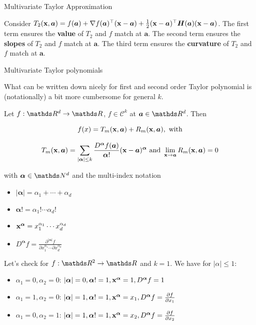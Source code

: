 \documentclass[11pt,compress,t,notes=noshow, xcolor=table]{beamer}
\begin{document}
\begin{vbframe}{Multivariate Taylor Approximation}
\begin{footnotesize}
Consider $T_2(\mathbf{x}, \bm{a}) = f(\bm{a}) + \nabla f(\bm{a})^\top (\mathbf{x} - \bm{a}) + \frac{1}{2}(\mathbf{x} - \bm{a})^\top\bm{H}(\bm{a})(\mathbf{x} - \bm{a})$. The first term ensures the \textbf{value} of $T_2$ and $f$ match at $\bm{a}$. The second term ensures the \textbf{slopes} of $T_2$ and $f$ match at $\bm{a}$. The third term ensures the \textbf{curvature} of $T_2$ and $f$ match at $\bm{a}$. 
\end{footnotesize}

\end{vbframe}


\begin{vbframe}{Multivariate Taylor polynomials}  

What can be written down nicely for first and second order Taylor polynomial is (notationally) a bit more cumbersome for general $k$.

\lz 

Let $f: \R^d \to \R$, $f \in \mathcal{C}^k$ at $\bm{a} \in \R^d$. Then 

$$
  f(x) = T_m(\mathbf{x}, \bm{a}) + R_m(\mathbf{x}, \bm{a}), \text{ with}
$$

$$
  T_m(\mathbf{x},\bm{a}) = \sum_{|\bm{\alpha}| \le k} \frac{D^{\bm{\alpha}} f(\bm{a})}{{\bm{\alpha}}!} (\mathbf{x} - \bm{a})^{\bm{\alpha}} \text{ and } \lim_{\mathbf{x} \to \bm{a}} R_m(\mathbf{x},\bm{a}) = 0
$$

with $\bm{\alpha} \in \N^d$ and the multi-index notation
\begin{itemize}
  \item $|\bm{\alpha}| = \alpha_1 + \cdots + \alpha_d$
  \item $\bm{\alpha}! = \alpha_1! \cdots \alpha_d!$
  \item $\mathbf{x}^{\bm{\alpha}} = x_1^{\alpha_1} \cdots x_d^{\alpha_d}$
  \item $D^{\bm{\alpha}} f = \frac{\partial^{|\bm{\alpha}|} f}{\partial x_1^{\alpha_1} \cdots \partial x_d^{\alpha_d}}$ 
\end{itemize}

\framebreak 

Let's check for $f: \R^2 \to \R$ and $k = 1$. We have for $|\alpha| \le 1$: 

\begin{itemize}
  \item $\alpha_1 = 0, \alpha_2 = 0$: $|\bm{\alpha}| = 0, \bm{\alpha}! = 1, \mathbf{x}^{\bm{\alpha}} = 1, D^{\bm{\alpha}} f = 1$
  \item $\alpha_1 = 1, \alpha_2 = 0$: $|\bm{\alpha}| = 1, \bm{\alpha}! = 1, \mathbf{x}^{\bm{\alpha}} = x_1, D^{\bm{\alpha}} f = \frac{\partial f}{\partial x_1}$
  \item $\alpha_1 = 0, \alpha_2 = 1$: $|\bm{\alpha}| = 1, \bm{\alpha}! = 1, \mathbf{x}^{\bm{\alpha}} = x_2, D^{\bm{\alpha}} f = \frac{\partial f}{\partial x_2}$
\end{itemize}


\end{vbframe}
\end{document}

